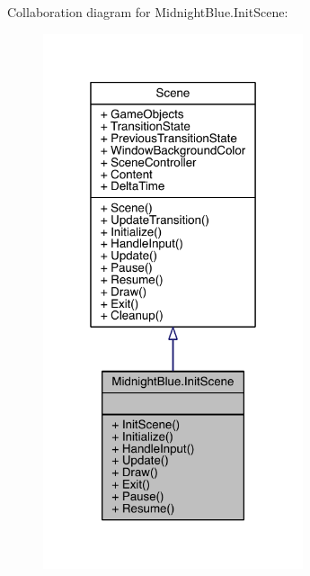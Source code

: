 Collaboration diagram for Midnight\+Blue.\+Init\+Scene\+:\nopagebreak
\begin{figure}[H]
\begin{center}
\leavevmode
\includegraphics[width=217pt]{class_midnight_blue_1_1_init_scene__coll__graph}
\end{center}
\end{figure}
